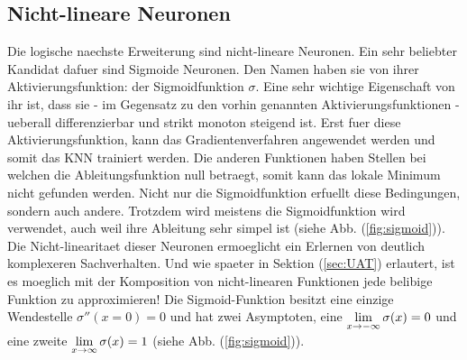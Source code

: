 \para{}
\cite{wiki:kuenstliches_neuron}

\subsection{Nicht-lineare Neuronen}
Die logische naechste Erweiterung sind nicht-lineare Neuronen.
Ein sehr beliebter Kandidat dafuer sind Sigmoide Neuronen.
Den Namen haben sie von ihrer Aktivierungsfunktion: der Sigmoidfunktion $\sigma$.
Eine sehr wichtige Eigenschaft von ihr ist, dass sie - im Gegensatz zu den vorhin
genannten Aktivierungsfunktionen - ueberall differenzierbar und strikt monoton
steigend ist. Erst fuer diese Aktivierungsfunktion, kann das Gradientenverfahren
angewendet werden und somit das KNN trainiert werden. Die anderen
Funktionen haben Stellen bei welchen die Ableitungsfunktion null
betraegt, somit kann das lokale Minimum nicht gefunden werden.
\para{}
Nicht nur die Sigmoidfunktion erfuellt diese Bedingungen, sondern auch andere.
Trotzdem wird meistens die Sigmoidfunktion wird
verwendet, auch weil ihre Ableitung sehr simpel ist (siehe Abb. (\ref{fig:sigmoid})).
Die Nicht-linearitaet dieser Neuronen ermoeglicht ein Erlernen von deutlich komplexeren Sachverhalten.
Und wie spaeter in Sektion (\ref{sec:UAT}) erlautert, ist es moeglich mit der Komposition von nicht-linearen
Funktionen jede belibige Funktion zu approximieren!
\para{}
Die Sigmoid-Funktion besitzt eine einzige Wendestelle $\sigma''(x=0)=0$ und hat
zwei Asymptoten, eine $\displaystyle\lim_{x \to -\infty} \sigma(x)=0$
und eine zweite $\displaystyle\lim_{x \to \infty} \sigma(x)=1$ (siehe Abb. (\ref{fig:sigmoid})).
\\
